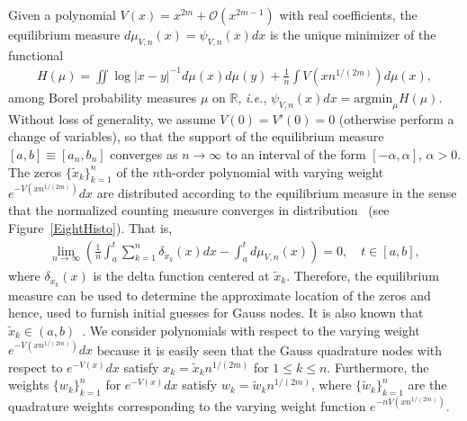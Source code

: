 \documentclass[final]{siamltex}
\begin{document}
Given a polynomial $V(x) = x^{2m}+ \mathcal O(x^{2m-1})$ with real coefficients, the equilibrium measure $d\mu_{V,n}(x) = \psi_{V,n}(x) dx$ is the unique minimizer of the functional~\cite{Deift_Book}
\begin{align*}
H(\mu) = \iint \log |x-y|^{-1} d\mu(x)d\mu(y) + \frac{1}{n}\int V(x n^{1/(2m)}) d\mu(x),
\end{align*}
among Borel probability measures $\mu$ on $\mathbb R$, \emph{i.e.}, $\psi_{V,n}(x) dx = \mathrm{argmin}_\mu H(\mu)$.  Without loss of generality, we assume $V(0) = V'(0) = 0$ (otherwise perform a change of variables), 
so that the support of the equilibrium measure $[a,b] \equiv [a_n,b_n]$ converges as $n\rightarrow \infty$ to an interval of the form $[-\alpha,\alpha]$, $\alpha > 0$.
The zeros $\{\tilde x_{k}\}_{k=1}^n$ of the $n$th-order polynomial with varying weight $e^{-V(x n^{1/(2m)})}dx$ are distributed according to the equilibrium measure in the sense that the normalized counting measure converges in distribution~\cite{Deift_Book} (see Figure~\ref{EightHisto}). That is,
\begin{align}\label{dist-conv}
\lim_{n\rightarrow\infty} \left(\frac{1}{n} \int_{a}^t \sum_{k=1}^n \delta_{\tilde x_{k}}(x) dx - \int_a^t d\mu_{V,n}(x) \right) = 0, \quad t \in [a,b],
\end{align}
where $\delta_{\tilde x_{k}}(x)$ is the delta function centered at $\tilde{x}_k$. Therefore, the equilibrium measure can be used to determine the approximate location of the zeros and hence, 
used to furnish initial guesses for Gauss nodes.  It is also known that $\tilde{x}_k \in (a,b)$~\cite[Prop.~3.42]{Deift_Book}.  We consider polynomials with respect to the varying weight $e^{-V(x n^{1/(2m)})}dx$ because it is easily seen that the Gauss quadrature nodes with respect to $e^{-V(x)}dx$ satisfy $ x_{k} = \tilde x_{k} n^{1/(2m)}$ for $1\leq k\leq n$.  Furthermore, the weights $\{w_k\}_{k=1}^n$ for $e^{-V(x)}dx$ satisfy $w_k = \tilde w_k n^{1/(2m)}$, where $\{\tilde w_k\}_{k=1}^n$ are the quadrature weights corresponding to the varying 
weight function $e^{-n V(xn^{1/(2m)})}$.
\end{document}

